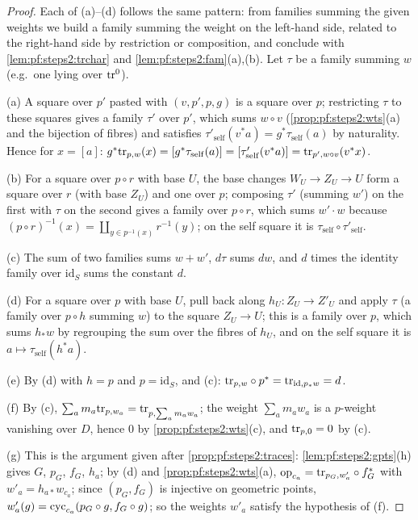 \begin{proof}
Each of (a)--(d) follows the same pattern: from families summing the given weights we build a
family summing the weight on the left-hand side, related to the right-hand side by restriction or
composition, and conclude with \cref{lem:pf:steps2:trchar} and \cref{lem:pf:steps2:fam}(a),(b).
Let $\tau$ be a family summing $w$ (e.g.\ one lying over $\mathrm{tr}^0$).

(a) A square over $p'$ pasted with $(v,p',p,g)$ is a square over $p$; restricting $\tau$ to these
squares gives a family $\tau'$ over $p'$, which sums $w\circ v$ (\cref{prop:pf:steps2:wts}(a) and the
bijection of fibres) and satisfies $\tau'_{\mathrm{self}}(v^\ast a)=g^\ast\tau_{\mathrm{self}}(a)$ by
naturality. Hence for $x=[a]$: $g^\ast\mathrm{tr}_{p,w}(x)=[g^\ast\tau_{\mathrm{self}}(a)]=
[\tau'_{\mathrm{self}}(v^\ast a)]=\mathrm{tr}_{p',w\circ v}(v^\ast x)$.

(b) For a square over $p\circ r$ with base $U$, the base changes $W_U\to Z_U\to U$ form a square over
$r$ (with base $Z_U$) and one over $p$; composing $\tau'$ (summing $w'$) on the first with $\tau$ on the
second gives a family over $p\circ r$, which sums $w'\cdot w$ because
$(p\circ r)^{-1}(x)=\coprod_{y\in p^{-1}(x)}r^{-1}(y)$; on the self square it is
$\tau_{\mathrm{self}}\circ\tau'_{\mathrm{self}}$.

(c) The sum of two families sums $w+w'$, $d\tau$ sums $dw$, and $d$ times the identity family over
$\mathrm{id}_S$ sums the constant $d$.

(d) For a square over $p$ with base $U$, pull back along $h_U\colon Z_U\to Z'_U$ and apply $\tau$ (a
family over $p\circ h$ summing $w$) to the square $Z_U\to U$; this is a family over $p$, which sums
$h_\ast w$ by regrouping the sum over the fibres of $h_U$, and on the self square it is
$a\mapsto\tau_{\mathrm{self}}(h^\ast a)$.

(e) By (d) with $h=p$ and $p=\mathrm{id}_S$, and (c): $\mathrm{tr}_{p,w}\circ
p^\ast=\mathrm{tr}_{\mathrm{id},p_\ast w}=d$.

(f) By (c), $\sum_am_a\mathrm{tr}_{p,w_a}=\mathrm{tr}_{p,\sum_am_aw_a}$; the weight $\sum_am_aw_a$ is a
$p$-weight vanishing over $D$, hence $0$ by \cref{prop:pf:steps2:wts}(c), and $\mathrm{tr}_{p,0}=0$ by
(c).

(g) This is the argument given after \cref{prop:pf:steps2:traces}: \cref{lem:pf:steps2:gpts}(h) gives
$G$, $p_G$, $f_G$, $h_a$; by (d) and \cref{prop:pf:steps2:wts}(a),
$\mathrm{op}_{c_a}=\mathrm{tr}_{p_G,w'_a}\circ f_G^\ast$ with $w'_a=h_{a\ast}w_{c_a}$; since $(p_G,f_G)$ is
injective on geometric points, $w'_a(g)=\mathrm{cyc}_{c_a}(p_G\circ g,f_G\circ g)$; so the weights
$w'_a$ satisfy the hypothesis of (f).
\end{proof}

